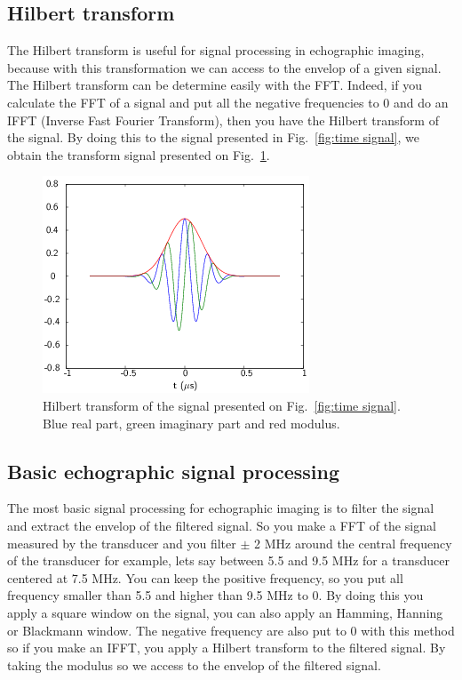 \documentclass[a4paper,twoside,11pt]{article}
\begin{document}
\FloatBarrier
\subsection{Hilbert transform}
\label{sec:Hilbert transform}

The Hilbert transform is useful for signal processing in echographic imaging, 
because with this transformation we can access to the envelop of a given 
signal. The Hilbert transform can be determine easily with the FFT. Indeed, if 
you calculate the FFT of a signal and put all the negative frequencies to 0 and 
do an IFFT (Inverse Fast Fourier Transform), then you have the Hilbert 
transform of the signal. By doing this to the signal presented in 
Fig.~\ref{fig:time signal}, we obtain the transform signal presented on 
Fig.~\ref{fig:hilbert transform}. 

\begin{figure}[htb]
	\centering
		\includegraphics{image/hilbert_transformb}
	\caption{Hilbert transform of the signal presented on 
Fig.~\ref{fig:time signal}. Blue real part, green imaginary part and red 
modulus.}
	\label{fig:hilbert transform}
\end{figure}

\subsection{Basic echographic signal processing}
\label{sec:Basic echographic signal processing}

The most basic signal processing for echographic imaging is to filter the 
signal and extract the envelop of the filtered signal. So you make a FFT of 
the signal measured by the transducer and you filter $\pm$ 2 MHz around the 
central frequency of the transducer for example, lets say between 5.5 and 9.5 
MHz for a transducer centered at 7.5 MHz. You can keep the positive frequency, 
so you put all frequency smaller than 5.5 and higher than 9.5 MHz to 0. By 
doing this you apply a square window on the signal, you can also apply an 
Hamming, Hanning or Blackmann window. The negative frequency are also put to 0 
with this method so if you make an IFFT, you apply a Hilbert transform to the 
filtered signal. By taking the modulus so we access to the envelop of the 
filtered signal.
\end{document}
